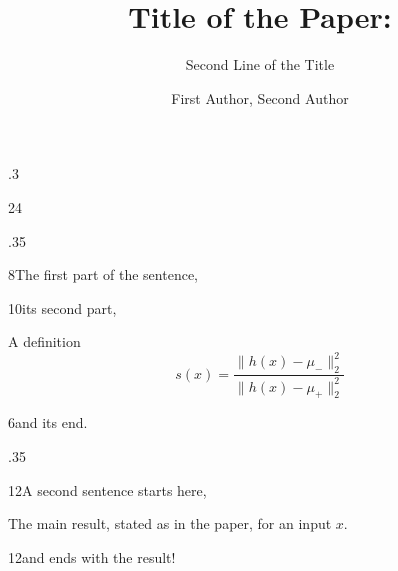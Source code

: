 \documentclass[final]{beamer}
\title{Title of the Paper:}
\subtitle{Second Line of the Title}
\author{First Author, Second Author}
\institute{Department, The Ohio State University}
\begin{document}
\begin{frame}[t]

\begin{cardrow}{.3}
  \begin{herocard}{24}
    \begin{minipage}[c]{.36\linewidth}
    \end{minipage}\hfill
    \begin{minipage}[c]{.5\linewidth}
    \end{minipage}\hfill
    \begin{minipage}[c]{.1\linewidth}
    \end{minipage}
  \end{herocard}
\end{cardrow}

\begin{cardrow}{.35}
  \begin{card}{8}{The first part of the sentence,}
  \end{card}
  \begin{card}{10}{its second part,}
    \begin{outlinebox}{A definition}
      \[ s(x) = \frac{\lVert h(x) - \mu_- \rVert_2^2}{\lVert h(x) - \mu_+ \rVert_2^2} \]
    \end{outlinebox}
  \end{card}
  \begin{card}{6}{and its end.}
  \end{card}
\end{cardrow}

\begin{cardrow}{.35}
  \begin{card}{12}{A second sentence starts here,}
    \begin{theorem}[Name]
      The main result, stated as in the paper, for an input $x$.
    \end{theorem}
  \end{card}
  \begin{card}{12}{and ends with the result!}
  \end{card}
\end{cardrow}

\end{frame}
\end{document}
